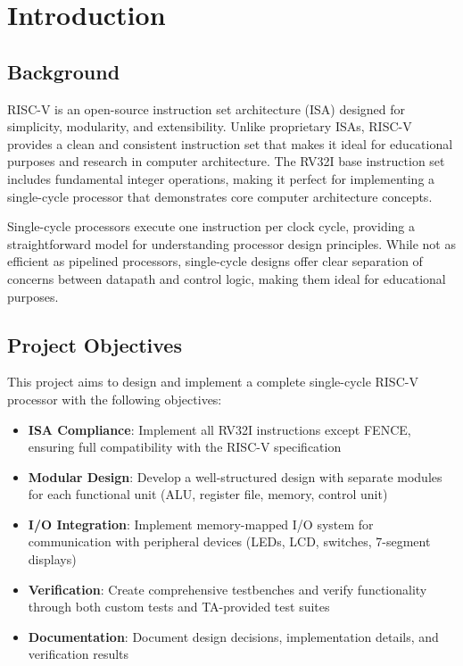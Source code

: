 \chapter{Introduction}

\section{Background}

RISC-V is an open-source instruction set architecture (ISA) designed for simplicity, modularity, and extensibility. Unlike proprietary ISAs, RISC-V provides a clean and consistent instruction set that makes it ideal for educational purposes and research in computer architecture. The RV32I base instruction set includes fundamental integer operations, making it perfect for implementing a single-cycle processor that demonstrates core computer architecture concepts.

Single-cycle processors execute one instruction per clock cycle, providing a straightforward model for understanding processor design principles. While not as efficient as pipelined processors, single-cycle designs offer clear separation of concerns between datapath and control logic, making them ideal for educational purposes.

\section{Project Objectives}

This project aims to design and implement a complete single-cycle RISC-V processor with the following objectives:

\begin{itemize}
    \item \textbf{ISA Compliance}: Implement all RV32I instructions except FENCE, ensuring full compatibility with the RISC-V specification
    \item \textbf{Modular Design}: Develop a well-structured design with separate modules for each functional unit (ALU, register file, memory, control unit)
    \item \textbf{I/O Integration}: Implement memory-mapped I/O system for communication with peripheral devices (LEDs, LCD, switches, 7-segment displays)
    \item \textbf{Verification}: Create comprehensive testbenches and verify functionality through both custom tests and TA-provided test suites
    \item \textbf{Documentation}: Document design decisions, implementation details, and verification results
\end{itemize}

